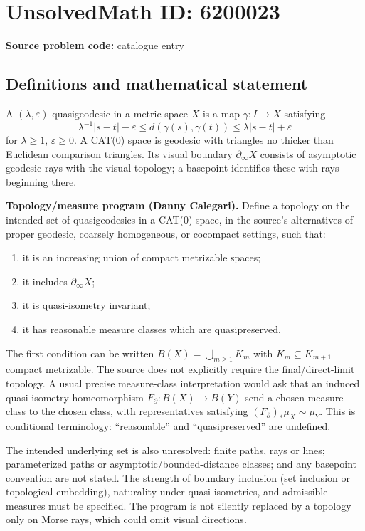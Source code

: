 \documentclass[11pt]{article}
\begin{document}
\section*{UnsolvedMath ID: 6200023}
\textbf{Source problem code:} catalogue entry
\subsection{Definitions and mathematical statement}
A $(\lambda,\varepsilon)$-quasigeodesic in a metric space $X$ is a map $\gamma:I\to X$ satisfying
\[
 \lambda^{-1}|s-t|-\varepsilon\leq d(\gamma(s),\gamma(t))
             \leq\lambda|s-t|+\varepsilon
\]
for $\lambda\geq1$, $\varepsilon\geq0$. A CAT(0) space is geodesic with triangles no thicker than Euclidean comparison triangles. Its visual boundary $\partial_\infty X$ consists of asymptotic geodesic rays with the visual topology; a basepoint identifies these with rays beginning there.

\textbf{Topology/measure program (Danny Calegari).} Define a topology on the intended set of quasigeodesics in a CAT(0) space, in the source's alternatives of proper geodesic, coarsely homogeneous, or cocompact settings, such that:
\begin{enumerate}
\item it is an increasing union of compact metrizable spaces;
\item it includes $\partial_\infty X$;
\item it is quasi-isometry invariant;
\item it has reasonable measure classes which are quasipreserved.
\end{enumerate}
The first condition can be written $B(X)=\bigcup_{m\geq1}K_m$ with $K_m\subseteq K_{m+1}$ compact metrizable. The source does not explicitly require the final/direct-limit topology. A usual precise measure-class interpretation would ask that an induced quasi-isometry homeomorphism $F_\partial:B(X)\to B(Y)$ send a chosen measure class to the chosen class, with representatives satisfying $(F_\partial)_*\mu_X\sim\mu_Y$. This is conditional terminology: ``reasonable'' and ``quasipreserved'' are undefined.

The intended underlying set is also unresolved: finite paths, rays or lines; parameterized paths or asymptotic/bounded-distance classes; and any basepoint convention are not stated. The strength of boundary inclusion (set inclusion or topological embedding), naturality under quasi-isometries, and admissible measures must be specified. The program is not silently replaced by a topology only on Morse rays, which could omit visual directions.
\end{document}
